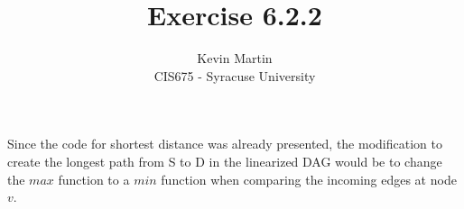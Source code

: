 \documentclass{article}
\author{Kevin Martin\\ CIS675 - Syracuse University}
\title{Exercise 6.2.2}
\begin{document}
\maketitle
Since the code for shortest distance was already presented, the modification
to create the longest path from S to D in the linearized DAG would be to change
the $max$ function to a $min$ function when comparing the incoming edges at node
$v$.
\end{document}
